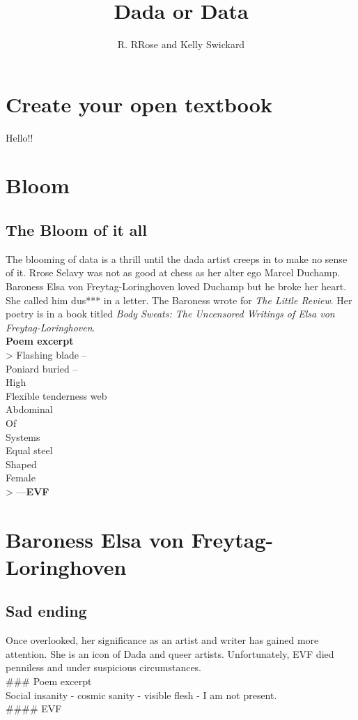 \documentclass[
  openany]{book}
\title{Dada or Data}
\author{R. RRose and Kelly Swickard}
\date{}
\begin{document}
\maketitle

{
\setcounter{tocdepth}{1}
\tableofcontents
}
\hypertarget{create-your-open-textbook}{%
\chapter{Create your open textbook}\label{create-your-open-textbook}}

Hello!!

\hypertarget{bloom}{%
\chapter{Bloom}\label{bloom}}

\hypertarget{the-bloom-of-it-all}{%
\section{The Bloom of it all}\label{the-bloom-of-it-all}}

The blooming of data is a thrill until the dada artist creeps in to make no sense of it. Rrose Selavy was not as good at chess as her alter ego Marcel Duchamp. Baroness Elsa von Freytag-Loringhoven loved Duchamp but he broke her heart. She called him dus*** in a letter. The Baroness wrote for \emph{The Little Review}. Her poetry is in a book titled \emph{Body Sweats: The Uncensored Writings of Elsa von Freytag-Loringhoven}.\\
\textbf{Poem excerpt}\\
\textgreater{} Flashing blade --\\
Poniard buried --\\
High\\
Flexible tenderness web\\
Abdominal\\
Of\\
Systems\\
Equal steel\\
Shaped\\
Female\\
\textgreater{} ---\textbf{EVF}

\hypertarget{baroness-elsa-von-freytag-loringhoven}{%
\chapter{Baroness Elsa von Freytag-Loringhoven}\label{baroness-elsa-von-freytag-loringhoven}}

\hypertarget{sad-ending}{%
\section{Sad ending}\label{sad-ending}}

Once overlooked, her significance as an artist and writer has gained more attention. She is an icon of Dada and queer artists. Unfortunately, EVF died penniless and under suspicious circumstances.\\
\#\#\# Poem excerpt\\
Social insanity - cosmic sanity - visible flesh - I am not present.\\
\#\#\#\# EVF
\end{document}
